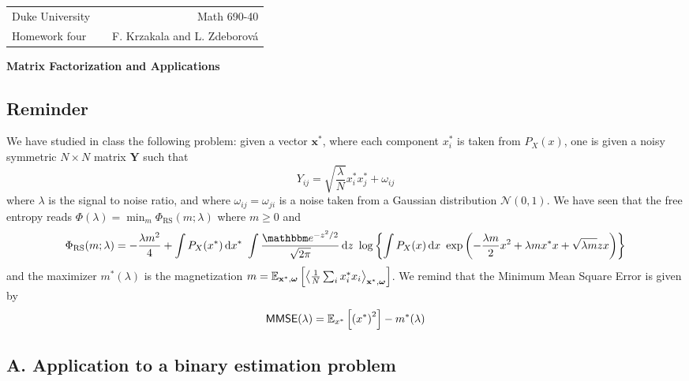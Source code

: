 \documentclass[a4paper,oneside,12pt]{article}
\begin{document}
\noindent

\begin{tabular}{lcr}
  Duke University & & Math 690-40 \\  
  Homework four & \hspace{6.3cm} & F. Krzakala and L. Zdeborov\'a\\ \hline
\end{tabular}

\begin{center}
  {\Large {\bf Matrix Factorization and Applications}}
\end{center}

\subsection*{Reminder}
We have studied in class the following problem: given a vector $ \mathbf{x}^* $, where each component $ x_i^* $ is taken from $ P_X(x) $, one is given a noisy symmetric $ N \times N $ matrix $ \mathbf{Y} $ such that
\begin{equation}
    Y_{ij} = \sqrt{ \frac{\lambda}{N} } x_i^* x_j^* + \omega_{ij} \label{def}
\end{equation}
where $ \lambda $ is the signal to noise ratio, and where $ \omega_{ij} = \omega_{ji} $ is a noise taken from a Gaussian distribution $ \mathcal{N}(0,1) $. 
We have seen that the free entropy reads $ \Phi(\lambda) = \min_m \Phi_{\mathrm{RS}}(m; \lambda) $ where $ m \ge 0 $ and
\begin{equation*}
    \Phi_{\mathrm{RS}}(m; \lambda)
    = -\frac{\lambda m^2}{4} + \int P_X(x^*) \dd x^* ~ \int \frac{ \ee^{-z^2/2} }{ \sqrt{2\pi} } \dd z ~ \log \clbrs{ \int P_X(x) \dd x ~ \exp \rdbrs{ -\frac{\lambda m}{2} x^2 + \lambda m x^* x + \sqrt{\lambda m} z x } }
\end{equation*}
and the maximizer $ m^*(\lambda) $ is the magnetization $ m = \mathbb{E}_{\mathbf{x}^*, \boldsymbol{\omega}} \left\lbrack  \left\langle  \frac{1}{N} \sum_i x_i^* x_i  \right\rangle_{\mathbf{x}^*, \boldsymbol{\omega}}  \right\rbrack $. 
We remind that the Minimum Mean Square Error is given by 
\begin{equation*}
    \mathsf{MMSE}(\lambda) = \mathbb{E}_{x^*} \left\lbrack  \left(  x^*  \right)^2  \right\rbrack - m^*(\lambda)
\end{equation*}

\subsection*{A. Application to a binary estimation problem}
\end{document}
